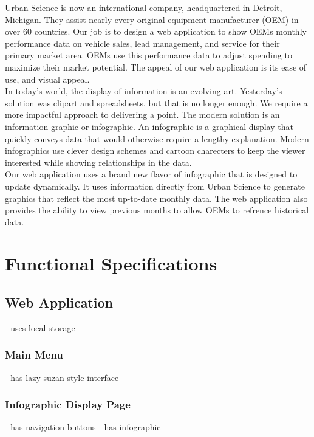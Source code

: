 \documentclass[11pt,a4paper,oneside]{article}
\begin{document}
Urban Science is now an international company, headquartered in Detroit, Michigan.  They assist nearly every original equipment manufacturer (OEM) in over 60 countries.  Our job is to design a web application to show OEMs monthly performance data on vehicle sales, lead management, and service for their primary market area.  OEMs use this performance data to adjust spending to maximize their market potential.  The appeal of our web application is its ease of use, and visual appeal.\\


In today's world, the display of information is an evolving art.  Yesterday's solution was clipart and spreadsheets, but that is no longer enough.  We require a more impactful approach to delivering a point.  The modern solution is an information graphic or infographic.  An infographic is a graphical display that quickly conveys data that would otherwise require a lengthy explanation.  Modern infographics use clever design schemes and cartoon charecters to keep the viewer interested while showing relationships in the data.\\


Our web application uses a brand new flavor of infographic that is designed to update dynamically.  It uses information directly from Urban Science to generate graphics that reflect the most up-to-date monthly data.  The web application also provides the ability to view previous months to allow OEMs to refrence historical data.\\


\section{Functional Specifications}

\subsection {Web Application}
 - uses local storage


\subsubsection {Main Menu}
 - has lazy suzan style interface
 - 

\subsubsection {Infographic Display Page}
 - has navigation buttons
 - has infographic
\end{document}
